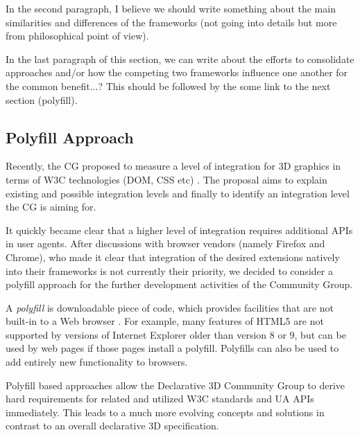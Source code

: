 \documentclass[review]{acmsiggraph}
\begin{document}
In the second paragraph, I believe we should write something about the main similarities and differences of the frameworks (not going into details but more from philosophical point of view).

In the last paragraph of this section, we can write about the efforts to consolidate approaches and/or how the competing two frameworks influence one another for the common benefit...? This should be followed by the some link to the next section (polyfill).

\newpage

\subsection{Polyfill Approach}
Recently, the CG proposed to measure a level of integration for 3D graphics in terms of W3C technologies (DOM, CSS etc) \cite{Dec3D-LevelsOfIntegration}. The proposal aims to explain existing and possible integration levels and finally to identify an integration level the CG is aiming for.

It quickly became clear that a higher level of integration requires additional APIs in user agents. After discussions with browser vendors (namely Firefox and Chrome), who made it clear that integration of the desired extensions natively into their frameworks is not currently their priority, we decided to consider a polyfill approach for the further development activities of the Community Group.

A \textit{polyfill} is downloadable piece of code, which provides facilities that are not built-in to a Web browser \cite{Sharp2010}. For example, many features of HTML5 are not supported by versions of Internet Explorer older than version 8 or 9, but can be used by web pages if those pages install a polyfill. Polyfills can also be used to add entirely new functionality to browsers.

Polyfill based approaches allow the Declarative 3D Community Group to derive hard requirements for related and utilized W3C standards and UA APIs immediately. This leads to a much more evolving concepts and solutions in contrast to an overall declarative 3D specification.
\end{document}
